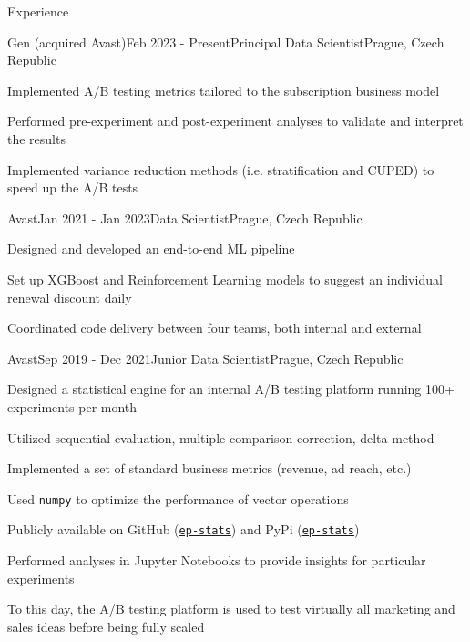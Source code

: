 \documentclass[
	11pt, %
]{resume} %
\begin{document}

\begin{rSection}{Experience}
	
	\begin{rSubsection}{Gen (acquired Avast)}{Feb 2023 - Present}{Principal Data Scientist}{Prague, Czech Republic}
        \item Implemented A/B testing metrics tailored to the subscription business model
        \item Performed pre-experiment and post-experiment analyses to validate and interpret the results
        \item Implemented variance reduction methods (i.e. stratification and CUPED) to speed up the A/B tests
	\end{rSubsection}
	
	
	\begin{rSubsection}{Avast}{Jan 2021 - Jan 2023}{Data Scientist}{Prague, Czech Republic}
		\item Designed and developed an end-to-end ML pipeline
		\item Set up XGBoost and Reinforcement Learning models to suggest an individual renewal discount daily
		\item Coordinated code delivery between four teams, both internal and external
	\end{rSubsection}
	
	
	\begin{rSubsection}{Avast}{Sep 2019 - Dec 2021}{Junior Data Scientist}{Prague, Czech Republic}
        \item Designed a statistical engine for an internal A/B testing platform running 100+ experiments per month
		\begin{rItemize}
			\item Utilized sequential evaluation, multiple comparison correction, delta method
			\item Implemented a set of standard business metrics (revenue, ad reach, etc.)
			\item Used \texttt{numpy} to optimize the performance of vector operations
			\item Publicly available on GitHub (\href{https://github.com/avast/ep-stats}{\texttt{ep-stats}}) and PyPi (\href{https://pypi.org/project/ep-stats/}{\texttt{ep-stats}})
		\end{rItemize}
		\item Performed analyses in Jupyter Notebooks to provide insights for particular experiments
		\item To this day, the A/B testing platform is used to test virtually all marketing and sales ideas before being fully scaled
	\end{rSubsection}
	

\end{rSection}
\end{document}
